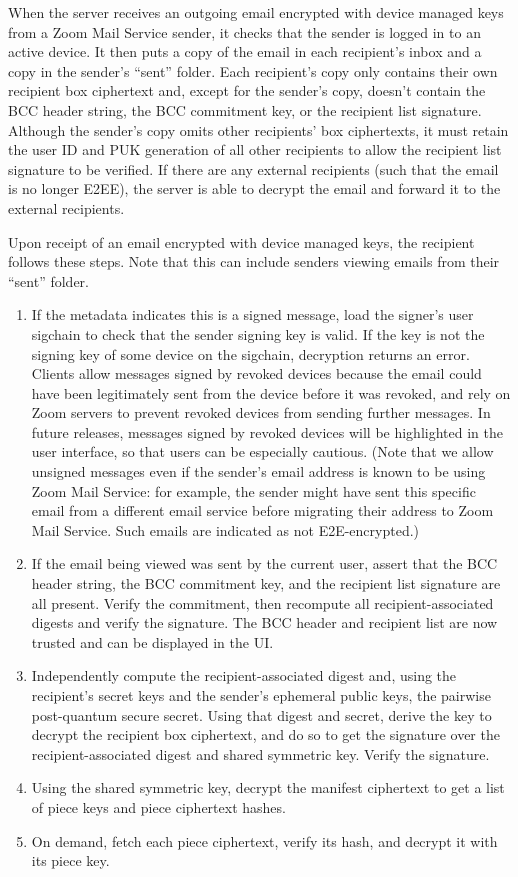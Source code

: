 When the server receives an outgoing email encrypted with device managed keys from a Zoom Mail
Service sender, it checks that the sender is logged in to an active device. It then puts a copy of
the email in each recipient's inbox and a copy in the sender's ``sent'' folder. Each recipient's
copy only contains their own recipient box ciphertext and, except for the sender's copy, doesn't
contain the BCC header string, the BCC commitment key, or the recipient list signature. Although the
sender's copy omits other recipients' box ciphertexts, it must retain the user ID and PUK generation
of all other recipients to allow the recipient list signature to be verified. If there are any
external recipients (such that the email is no longer E2EE), the server is able to decrypt the email
and forward it to the external recipients.

Upon receipt of an email encrypted with device managed keys, the recipient follows these steps. Note
that this can include senders viewing emails from their ``sent'' folder.

\begin{enumerate}
\item If the metadata indicates this is a signed message, load
the signer's user sigchain to check that the sender signing key is valid. If the key is not the
signing key of some device on the sigchain, decryption returns an error. Clients allow messages
signed by revoked devices because the email could have been legitimately sent from the device before
it was revoked, and rely on Zoom servers to prevent revoked devices from sending further messages.
In future releases, messages signed by revoked devices will be highlighted in the user interface, so
that users can be especially cautious. (Note that we allow unsigned messages even if the sender's
email address is known to be using Zoom Mail Service: for example, the sender might have sent this
specific email from a different email service before migrating their address to Zoom Mail Service.
Such emails are indicated as not E2E-encrypted.)
\item If the email being viewed was sent by the current user, assert that the BCC header string, the
BCC commitment key, and the recipient list signature are all present. Verify the commitment, then
recompute all recipient-associated digests and verify the signature. The BCC header and recipient
list are now trusted and can be displayed in the UI.
\item Independently compute the recipient-associated digest and, using the recipient's secret keys
and the sender's ephemeral public keys, the pairwise post-quantum secure secret. Using that digest
and secret, derive the key to decrypt the recipient box ciphertext, and do so to get the signature
over the recipient-associated digest and shared symmetric key. Verify the signature.
\item Using the shared symmetric key, decrypt the manifest ciphertext to get a list of piece keys
and piece ciphertext hashes.
\item On demand, fetch each piece ciphertext, verify its hash, and decrypt it with its piece key.
\end{enumerate}


